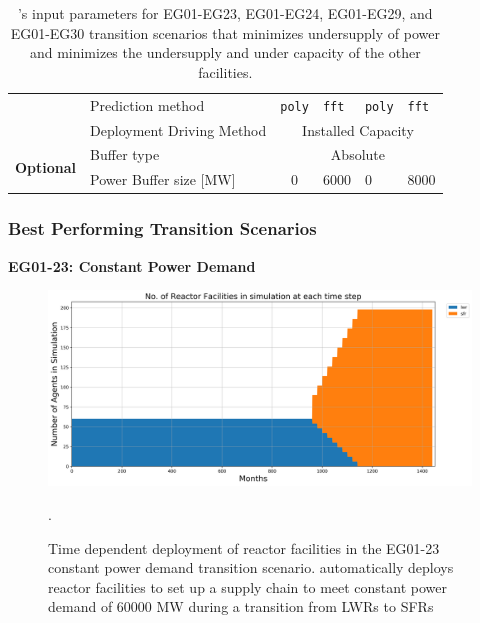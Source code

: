\begin{frame}
\begin{table}[]
{\begin{tabular}{|l|l|c|l|l|l|}
			& Prediction method                                              & \texttt{poly}       & \texttt{fft}             & \texttt{poly}         &  \texttt{fft}    \\ \cline{2-6} 
			& Deployment Driving Method                                      & \multicolumn{4}{c|}{Installed Capacity}                                                                                                                                                                                                                                                                    \\ \hline
			\multirow{2}{*}{\textbf{Optional}} & Buffer type                                                    & \multicolumn{4}{c|}{Absolute}                                                                                                                                                                                                                                                               \\ \cline{2-6} 
			& Power Buffer size [MW]                                                   & 0 & 6000 & 0 & 8000 \\ \hline
		\end{tabular}%
	}
	\caption{\deploy's input parameters for EG01-EG23, EG01-EG24, EG01-EG29, and 
		EG01-EG30 transition scenarios
		that minimizes undersupply of power and minimizes 
		the undersupply and under capacity of the other facilities. }
	\label{tab:bestinputs}
\end{table}
\end{frame}

\begin{frame}
\frametitle{Best Performing Transition Scenarios}
\textbf{EG01-23: Constant Power Demand}
\begin{figure}[htbp!]
\begin{center}
	\includegraphics[width=\textwidth]{images/eg23-stack_reactor.png}
\end{center}
\caption{Time dependent deployment of reactor facilities in 
	the EG01-23 constant power demand transition scenario. 
	\deploy automatically deploys reactor facilities 
	to set up a supply chain to meet constant power demand of $60000$ MW
	during a transition from \glspl{LWR} to \glspl{SFR}}.
\end{figure}
\end{frame}

